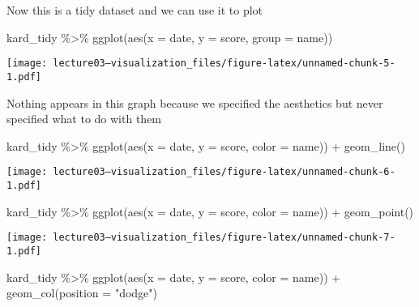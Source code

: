 \documentclass[
]{article}
\newenvironment{Shaded}{\begin{snugshade}}{\end{snugshade}}
\newcommand{\AttributeTok}[1]{\textcolor[rgb]{0.77,0.63,0.00}{#1}}
\newcommand{\FunctionTok}[1]{\textcolor[rgb]{0.00,0.00,0.00}{#1}}
\newcommand{\NormalTok}[1]{#1}
\newcommand{\SpecialCharTok}[1]{\textcolor[rgb]{0.00,0.00,0.00}{#1}}
\newcommand{\StringTok}[1]{\textcolor[rgb]{0.31,0.60,0.02}{#1}}
\begin{document}
Now this is a tidy dataset and we can use it to plot

\begin{Shaded}
\begin{Highlighting}[]
\NormalTok{kard\_tidy }\SpecialCharTok{\%\textgreater{}\%} 
  \FunctionTok{ggplot}\NormalTok{(}\FunctionTok{aes}\NormalTok{(}\AttributeTok{x =}\NormalTok{ date, }\AttributeTok{y =}\NormalTok{ score, }\AttributeTok{group =}\NormalTok{ name))}
\end{Highlighting}
\end{Shaded}

\texttt{[image: lecture03---visualization\_files/figure-latex/unnamed-chunk-5-1.pdf]}

Nothing appears in this graph because we specified the aesthetics but
never specified what to do with them

\begin{Shaded}
\begin{Highlighting}[]
\NormalTok{kard\_tidy }\SpecialCharTok{\%\textgreater{}\%} 
  \FunctionTok{ggplot}\NormalTok{(}\FunctionTok{aes}\NormalTok{(}\AttributeTok{x =}\NormalTok{ date, }\AttributeTok{y =}\NormalTok{ score, }\AttributeTok{color =}\NormalTok{ name)) }\SpecialCharTok{+}
  \FunctionTok{geom\_line}\NormalTok{()}
\end{Highlighting}
\end{Shaded}

\texttt{[image: lecture03---visualization\_files/figure-latex/unnamed-chunk-6-1.pdf]}

\begin{Shaded}
\begin{Highlighting}[]
\NormalTok{kard\_tidy }\SpecialCharTok{\%\textgreater{}\%} 
  \FunctionTok{ggplot}\NormalTok{(}\FunctionTok{aes}\NormalTok{(}\AttributeTok{x =}\NormalTok{ date, }\AttributeTok{y =}\NormalTok{ score, }\AttributeTok{color =}\NormalTok{ name)) }\SpecialCharTok{+}
  \FunctionTok{geom\_point}\NormalTok{()}
\end{Highlighting}
\end{Shaded}

\texttt{[image: lecture03---visualization\_files/figure-latex/unnamed-chunk-7-1.pdf]}

\begin{Shaded}
\begin{Highlighting}[]
\NormalTok{kard\_tidy }\SpecialCharTok{\%\textgreater{}\%} 
  \FunctionTok{ggplot}\NormalTok{(}\FunctionTok{aes}\NormalTok{(}\AttributeTok{x =}\NormalTok{ date, }\AttributeTok{y =}\NormalTok{ score, }\AttributeTok{color =}\NormalTok{ name)) }\SpecialCharTok{+}
  \FunctionTok{geom\_col}\NormalTok{(}\AttributeTok{position =} \StringTok{"dodge"}\NormalTok{)}
\end{Highlighting}
\end{Shaded}
\end{document}
